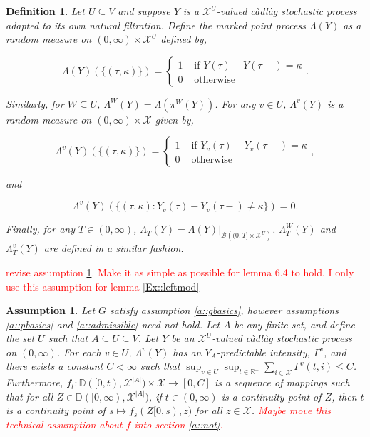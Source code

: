 \documentclass[12pt]{article}
\newcommand{\mb}{\mathbb}
\newcommand{\mc}{\mathcal}
\newcommand{\ms}{\mathscr}
\newcommand{\ra}{\rightarrow}
\newcommand{\te}{\text}
\newcommand{\tr}{\textcolor{red}}
\newcommand{\ind}{\hspace{24pt}}
\newcommand{\cad}{\mb{D}}							%
\newcommand{\sta}{\mc{X}}							%
\newcommand{\proj}{\pi}								%
\newcommand{\vind}[1]{_{#1}}						%
\newcommand{\tme}[1]{(#1)}							%
\newcommand{\tmi}[1]{#1}							%
\newcommand{\vpara}[1]{^{#1}}						%
\newcommand{\tpara}[1]{_{#1}}						%
\newcommand{\Xg}{Y}									%
\newcommand{\pmap}{\Lambda}							%
\newcommand{\rt}{\tau}								%
\renewcommand{\mark}{\kappa}						%
\newcommand{\ratee}{\Gamma}							%
\newcommand{\Xh}{Z}									%
\newtheorem{defn}[thms]{Definition}
\newtheorem{assu}[thms]{Assumption}
\begin{document}
\begin{defn}
Let \(U\subseteq V\) and suppose \(\Xg\) is a \(\sta^U\)-valued c\`adl\`ag stochastic process adapted to its own natural filtration. Define the marked point process \(\pmap(\Xg)\) as a random measure on \((0,\infty) \times \sta^U\) defined by,

\[\pmap(\Xg)(\{(\rt,\mark)\}) = \begin{cases}
1 &\te{ if } \Xg\tme{\rt} - \Xg\tme{\rt-} = \mark\\
0 &\te{ otherwise}
\end{cases}.\]

Similarly, for \(W \subseteq U\), \(\pmap\vpara{W}(\Xg) = \pmap\left(\proj\vpara{W}(\Xg)\right)\). For any \(v\in U\), \(\pmap\vpara{v}(\Xg)\) is a random measure on \((0,\infty) \times \sta\) given by,

\[\pmap\vpara{v}(\Xg)(\{(\rt,\mark)\}) = \begin{cases}
1 &\te{ if } \Xg\vind{v}\tme{\rt} - \Xg\vind{v}\tme{\rt-} = \mark\\
0 &\te{ otherwise}
\end{cases},\]

and

\[\pmap\vpara{v}(\Xg)(\{(\rt,\mark): \Xg\vind{v}\tme{\rt} - \Xg\vind{v}\tme{\rt-} \neq \mark\}) = 0.\]

Finally, for any \(T\in (0,\infty)\), \(\pmap\tpara{T}(\Xg) = \pmap(\Xg)|_{\ms{B}\left((0,T]\times\sta^U\right)}\). \(\pmap\vpara{W}\tpara{T}(\Xg)\) and \(\pmap\vpara{v}\tpara{T}(\Xg)\) are defined in a similar fashion.
\label{Ex::pmap}
\end{defn}

\ind \tr{revise assumption \ref{Ex::Eassu}. Make it as simple as possible for lemma 6.4 to hold. I only use this assumption for lemma \ref{Ex::leftmod}}

\begin{assu}
Let \(G\) satisfy assumption \ref{a::gbasics}, however assumptions \ref{a::pbasics} and \ref{a::admissible} need not hold. Let \(A\) be any finite set, and define the set \(U\) such that \(A\subseteq U \subseteq V\). Let \(\Xg\) be an \(\sta^U\)-valued c\`adl\`ag stochastic process on \((0,\infty)\). For each \(v\in U\), \(\pmap\vpara{v}(\Xg)\) has an \(\Xg\vind{A}\)-predictable intensity, \(\ratee\vpara{v}\), and there exists a constant \(C < \infty\) such that \(\sup_{v\in U}\sup_{t\in \mb{R}^+}\sum_{i \in \sta} \ratee\vpara{v}(t,i) \leq C\). Furthermore, \(f\tpara{t}: \cad([0,t),\sta^{|A|})\times \sta\ra[0,C]\) is a sequence of mappings such that for all \(\Xh \in \cad([0,\infty),\sta^{|A|})\), if \(t\in (0,\infty)\) is a continuity point of \(\Xh\), then \(t\) is a continuity point of \(s \mapsto f\tpara{s}(\Xh\tmi{[0,s)},z)\) for all \(z \in \sta\). \tr{Maybe move this technical assumption about \(f\) into section \ref{a::not}.}
\label{Ex::Eassu}
\end{assu}
\end{document}
